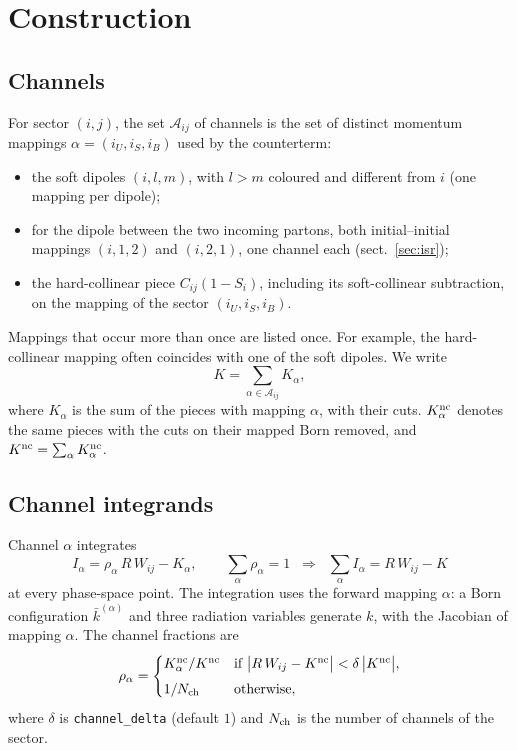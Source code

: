 \documentclass[11pt,a4paper]{article}
\newcommand{\kb}{\bar k}
\newcommand{\Nch}{N_{\rm ch}}
\newcommand{\nc}{{\rm nc}}
\begin{document}
\section{Construction}

\subsection{Channels}
For sector $(i,j)$, the set $\mathcal A_{ij}$ of channels is the set of
distinct momentum mappings $\alpha=(i_U,i_S,i_B)$ used by the counterterm:
\begin{itemize}
\item the soft dipoles $(i,l,m)$, with $l>m$ coloured and different from $i$
      (one mapping per dipole);
\item for the dipole between the two incoming partons, both initial--initial
      mappings $(i,1,2)$ and $(i,2,1)$, one channel each
      (sect.~\ref{sec:isr});
\item the hard-collinear piece $C_{ij}(1-S_i)$, including its soft-collinear
      subtraction, on the mapping of the sector $(i_U,i_S,i_B)$.
\end{itemize}
Mappings that occur more than once are listed once. For example, the
hard-collinear mapping often coincides with one of the soft dipoles. We write
\begin{equation}
  K = \sum_{\alpha\in\mathcal A_{ij}} K_\alpha ,
\end{equation}
where $K_\alpha$ is the sum of the pieces with mapping $\alpha$, with their cuts.
$K^\nc_\alpha$ denotes the same pieces with the cuts on their mapped Born
removed, and $K^\nc=\sum_\alpha K^\nc_\alpha$.

\subsection{Channel integrands}
Channel $\alpha$ integrates
\begin{equation}
  I_\alpha = \rho_\alpha\,R\,W_{ij} - K_\alpha ,
  \qquad
  \sum_{\alpha} \rho_\alpha = 1
  \;\;\Longrightarrow\;\;
  \sum_\alpha I_\alpha = R\,W_{ij} - K
  \label{eq:Ialpha}
\end{equation}
at every phase-space point. The integration uses the forward mapping
$\alpha$: a Born configuration $\kb^{(\alpha)}$ and three radiation variables
generate $k$, with the Jacobian of mapping $\alpha$. The channel fractions are
\begin{equation}
  \rho_\alpha =
  \begin{cases}
    K^\nc_\alpha / K^\nc
      & \text{if } \big|R\,W_{ij} - K^\nc\big| < \delta\,\big|K^\nc\big| ,\\[4pt]
    1/\Nch & \text{otherwise},
  \end{cases}
  \label{eq:rho}
\end{equation}
where $\delta$ is \texttt{channel\_delta} (default $1$) and $\Nch$ is the number
of channels of the sector.
\end{document}
